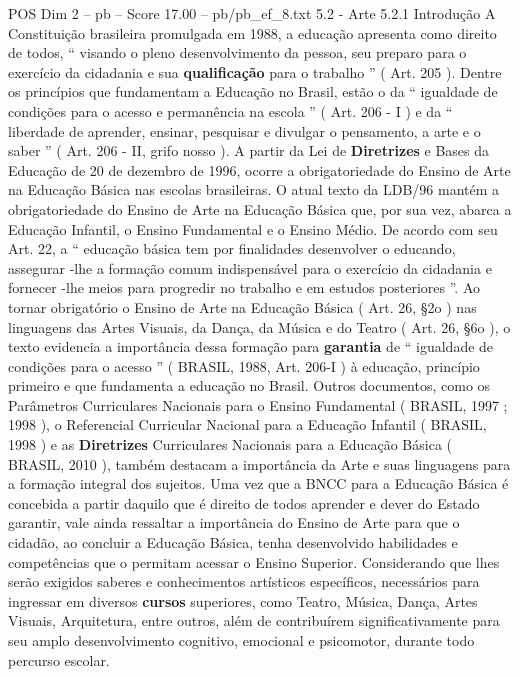 \begin{textsample}{POS Dim 2 – pb – Score 17.00 – pb/pb\_ef\_8.txt}  \label{ex:f2_pos_278}
5.2 - Arte 5.2.1 Introdução A Constituição brasileira promulgada em 1988, a educação apresenta como direito de todos, “ visando o pleno desenvolvimento da pessoa, seu preparo para o exercício da cidadania e sua \textbf{qualificação} para o trabalho ” ( Art. 205 ).
Dentre os princípios que fundamentam a Educação no Brasil, estão o da “ igualdade de condições para o acesso e permanência na escola ” ( Art. 206 - I ) e da “ liberdade de aprender, ensinar, pesquisar e divulgar o pensamento, a arte e o saber ” ( Art. 206 - II, grifo nosso ).
A partir da Lei de \textbf{Diretrizes} e Bases da Educação de 20 de dezembro de 1996, ocorre a obrigatoriedade do Ensino de Arte na Educação Básica nas escolas brasileiras.
O atual texto da LDB/96 mantém a obrigatoriedade do Ensino de Arte na Educação Básica que, por sua vez, abarca a Educação Infantil, o Ensino Fundamental e o Ensino Médio.
De acordo com seu Art. 22, a “ educação básica tem por finalidades desenvolver o educando, assegurar -lhe a formação comum indispensável para o exercício da cidadania e fornecer -lhe meios para progredir no trabalho e em estudos posteriores ”.
Ao tornar obrigatório o Ensino de Arte na Educação Básica ( Art. 26, §2o ) nas linguagens das Artes Visuais, da Dança, da Música e do Teatro ( Art. 26, §6o ), o texto evidencia a importância dessa formação para \textbf{garantia} de “ igualdade de condições para o acesso ” ( BRASIL, 1988, Art. 206-I ) à educação, princípio primeiro e que fundamenta a educação no Brasil.
Outros documentos, como os Parâmetros Curriculares Nacionais para o Ensino Fundamental ( BRASIL, 1997 ; 1998 ), o Referencial Curricular Nacional para a Educação Infantil ( BRASIL, 1998 ) e as \textbf{Diretrizes} Curriculares Nacionais para a Educação Básica ( BRASIL, 2010 ), também destacam a importância da Arte e suas linguagens para a formação integral dos sujeitos.
Uma vez que a BNCC para a Educação Básica é concebida a partir daquilo que é direito de todos aprender e dever do Estado garantir, vale ainda ressaltar a importância do Ensino de Arte para que o cidadão, ao concluir a Educação Básica, tenha desenvolvido habilidades e competências que o permitam acessar o Ensino Superior.
Considerando que lhes serão exigidos saberes e conhecimentos artísticos específicos, necessários para ingressar em diversos \textbf{cursos} superiores, como Teatro, Música, Dança, Artes Visuais, Arquitetura, entre outros, além de contribuírem significativamente para seu amplo desenvolvimento cognitivo, emocional e psicomotor, durante todo percurso escolar.

\end{textsample}
